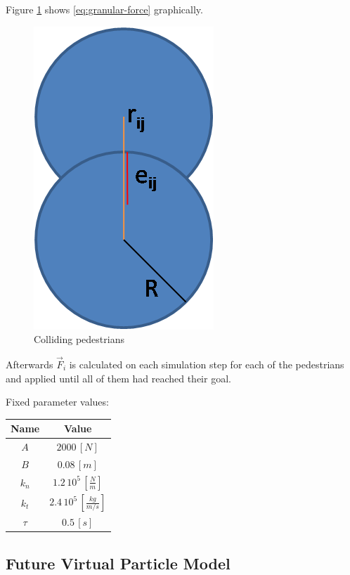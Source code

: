 \documentclass[draftclsnofoot]{IEEEtran}
\begin{document}
Figure \ref{fig:colliding-pedestrians} shows \ref{eq:granular-force}
graphically.

\begin{figure}[h]
    \begin{centering}
    \includegraphics[scale=0.4]{pics/sfm/ganular} 
    \par\end{centering}
    \caption{Colliding pedestrians\label{fig:colliding-pedestrians}}
\end{figure}

Afterwards $\vec{F}_{i}$ is calculated on each simulation step for
each of the pedestrians and applied until all of them had reached
their goal.

Fixed parameter values:

\begin{center}
    \begin{tabular}{|c|c|}
    \hline 
    Name & Value\tabularnewline
    \hline 
    \hline 
    $A$ & $2000\,[N]$\tabularnewline
    \hline 
    $B$ & $0.08\,[m]$\tabularnewline
    \hline 
    $k_{n}$ & $1.2\,10^{5}\,[\frac{N}{m}]$\tabularnewline
    \hline 
    $k_{t}$ & $2.4\,10^{5}\,[\frac{kg}{m/s}]$\tabularnewline
    \hline 
    $\tau$ & $0.5\,[s]$\tabularnewline
    \hline 
    \end{tabular}
    \par
\end{center}


\subsection{Future Virtual Particle Model}
\end{document}
